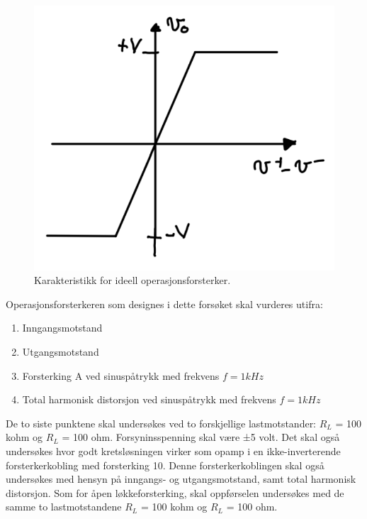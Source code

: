 \begin{figure}[!hbt]
	\centering
	\includegraphics[scale=0.5]{./Images/01Issue/02_karakteristikk.png}
	\caption{ Karakteristikk for ideell operasjonsforsterker.}
	\label{fig:02karakteristikk}
\end{figure}

Operasjonsforsterkeren som designes i dette forsøket skal vurderes utifra:

\begin{enumerate}
	\item Inngangsmotstand
	\item Utgangsmotstand
	\item Forsterking A ved sinuspåtrykk med frekvens $f = 1 kHz$
	\item Total harmonisk distorsjon ved sinuspåtrykk med frekvens $f = 1 kHz$
\end{enumerate}

De to siste punktene skal undersøkes ved to forskjellige lastmotstander: $R_L$ = 100 kohm og $R_L$ = 100 ohm. 
\newline Forsyninsspenning skal være ±5 volt. 
\newline Det skal også undersøkes hvor godt kretsløsningen virker som opamp i en ikke-inverterende forsterkerkobling med forsterking 10. Denne forsterkerkoblingen skal også undersøkes med hensyn på inngangs- og utgangsmotstand, samt total harmonisk distorsjon. Som for åpen løkkeforsterking, skal oppførselen undersøkes med de samme to lastmotstandene $R_L$ = 100 kohm og $R_L$ = 100 ohm.